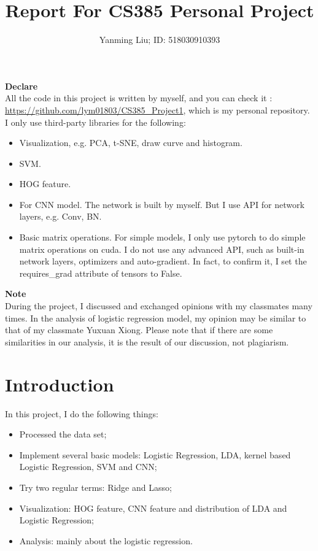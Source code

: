 \documentclass{article}
\title{Report For CS385 Personal Project}
\author{Yanming Liu; ID: 518030910393}
\begin{document}
\maketitle
\noindent\textbf{Declare} \\
All the code in this project is written by myself, and you can check it : \url{https://github.com/lym01803/CS385_Project1}, which is 
my personal repository. I only use third-party libraries for the following: 
\begin{itemize}
    \item Visualization, e.g. PCA, t-SNE, draw curve and histogram.
    \item SVM.
    \item HOG feature.
    \item For CNN model. The network is built by myself. But I use API for network layers, e.g. Conv, BN.
    \item Basic matrix operations. For simple models, I only use pytorch to do simple matrix operations on cuda. I do not use any advanced API, such as 
    built-in network layers, optimizers and auto-gradient. In fact, to confirm it, I set the requires\_grad attribute of tensors to False.
\end{itemize}
\textbf{Note}\\
During the project, I discussed and exchanged opinions with my classmates many times. In the analysis of logistic regression model, my opinion may 
be similar to that of my classmate Yuxuan Xiong. Please note that if there are some similarities in our analysis, it is the result of our discussion, not plagiarism.

\section{Introduction}
In this project, I do the following things:
\begin{itemize}
    \item Processed the data set;
    \item Implement several basic models: Logistic Regression, LDA, kernel based Logistic Regression, SVM and CNN;
    \item Try two regular terms: Ridge and Lasso;
    \item Visualization: HOG feature, CNN feature and distribution of LDA and Logistic Regression;
    \item Analysis: mainly about the logistic regression. 
\end{itemize}
\end{document}
